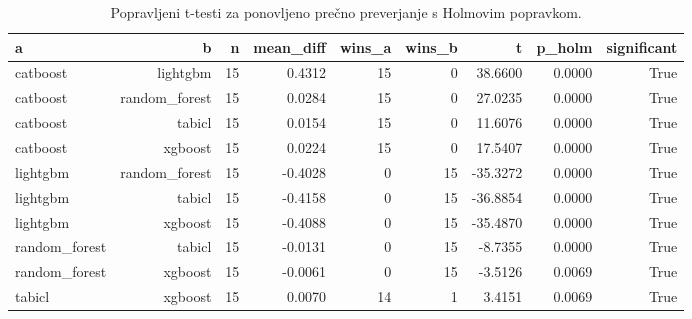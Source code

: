 \begin{table}[htbp]
\centering
\caption{Popravljeni t-testi za ponovljeno prečno preverjanje s Holmovim popravkom.}
\label{tab:corrected-ttest}
\begin{tabular}{lrrrrrrrr}
\hline
a & b & n & mean\_diff & wins\_a & wins\_b & t & p\_holm & significant \\
\hline
catboost & lightgbm & 15 & 0.4312 & 15 & 0 & 38.6600 & 0.0000 & True \\
catboost & random\_forest & 15 & 0.0284 & 15 & 0 & 27.0235 & 0.0000 & True \\
catboost & tabicl & 15 & 0.0154 & 15 & 0 & 11.6076 & 0.0000 & True \\
catboost & xgboost & 15 & 0.0224 & 15 & 0 & 17.5407 & 0.0000 & True \\
lightgbm & random\_forest & 15 & -0.4028 & 0 & 15 & -35.3272 & 0.0000 & True \\
lightgbm & tabicl & 15 & -0.4158 & 0 & 15 & -36.8854 & 0.0000 & True \\
lightgbm & xgboost & 15 & -0.4088 & 0 & 15 & -35.4870 & 0.0000 & True \\
random\_forest & tabicl & 15 & -0.0131 & 0 & 15 & -8.7355 & 0.0000 & True \\
random\_forest & xgboost & 15 & -0.0061 & 0 & 15 & -3.5126 & 0.0069 & True \\
tabicl & xgboost & 15 & 0.0070 & 14 & 1 & 3.4151 & 0.0069 & True \\
\hline
\end{tabular}
\end{table}
